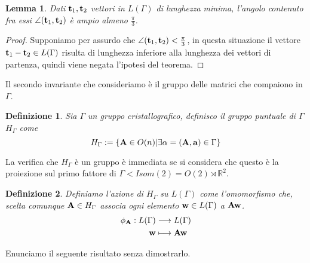 \documentclass[a4paper,11pt,openright,twoside	]{book}
\newtheorem{definition}{Definizione}[section]
\newtheorem{lemma}[theorem]{Lemma}
\begin{document}
\begin{lemma}
\label{lemma:pi3}
Dati $\vb{t}_1, \vb{t}_2$ vettori in $L(\Gamma)$ di lunghezza minima, l'angolo contenuto fra essi $\angle( \vb{t}_1, \vb{t}_2)$ è ampio almeno $ \frac{\pi}{3}$. 
\end{lemma}	
\begin{proof}
Supponiamo per assurdo che $\angle( \vb{t}_1, \vb{t}_2) < \frac{\pi}{3}$, in questa situazione il vettore \\ $\vb{t}_1 - \vb{t}_2 \in L(\Gamma)$ risulta di lunghezza inferiore alla lunghezza dei vettori di partenza, quindi viene negata l'ipotesi del teorema. 
\end{proof}
Il secondo invariante che consideriamo è il gruppo delle matrici che compaiono in $\Gamma$. 
\begin{definition}
Sia $\Gamma$ un gruppo cristallografico, definisco il gruppo puntuale di $\Gamma$ $H_{\Gamma}$ come
\[ H_{\Gamma} := \{ \vb{A} \in O(n) | \exists \alpha = (\vb{A,a}) \in \Gamma  \} \]
\end{definition}
La verifica che $H_{\Gamma}$ è un gruppo è immediata se si considera che questo è la proiezione sul primo fattore di $\Gamma < Isom(2) = O(2) \rtimes
\mathbb{R}^2$.\\
\begin{definition}
Definiamo l'azione di $H_{\Gamma}$ su $L(\Gamma)$  come l'omomorfismo che, scelta comunque $\vb{A} \in H_{\Gamma}$ associa ogni elemento $\vb{w} \in L(\Gamma)$ a $\vb{Aw}$.
\begin{equation*}
\begin{split}
\phi_{\vb{A}} : L(\Gamma) & \longrightarrow L(\Gamma) \\
\vb{w} & \longmapsto \vb{Aw}
\end{split} 
\end{equation*}
\end{definition}
Enunciamo il seguente risultato senza dimostrarlo.
\end{document}
